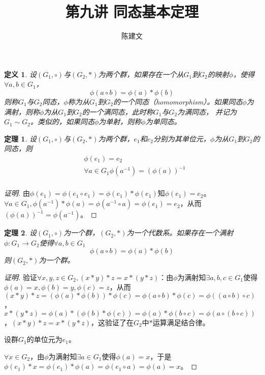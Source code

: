 \documentclass{article}
\newtheorem{Def}{定义}
\newtheorem{Thm}{定理}
\begin{document}
\begin{CJK*}{UTF8}{gbsn}
  \title{第九讲 同态基本定理}
  \author{陈建文}
  \maketitle
  

\begin{Def}
  设$(G_1,\circ)$与$(G_2,*)$为两个群，如果存在一个从$G_1$到$G_2$的映射$\phi$，使得$\forall a,b\in G_1$，\[\phi(a\circ b)=\phi(a)* \phi(b)\]
  则称$G_1$与$G_2$同态，$\phi$称为从$G_1$到$G_2$的一个同态（homomorphism）。如果同态$\phi$为满射，则称$\phi$为从$G_1$到$G_2$的一个满同态，此时称$G_1$与$G_2$为满同态，
  并记为$G_1\sim G_2$。类似的，如果同态$\phi$为单射，则称$\phi$为单同态。
\end{Def}

\begin{Thm}
  设$(G_1,\circ)$与$(G_2,*)$为两个群，$e_1$和$e_2$分别为其单位元，$\phi$为从$G_1$到$G_2$的同态，则
  \begin{align*}
    &\phi(e_1)=e_2\\
    &\forall a\in G_1 \phi(a^{-1})=(\phi(a))^{-1}\\
  \end{align*}
\end{Thm}
\begin{proof}[证明]
  由$\phi(e_1)=\phi(e_1\circ e_1)=\phi(e_1)*\phi(e_1)$知$\phi(e_1)=e_2$。
  $\forall a\in G_1, \phi(a^{-1})*\phi(a)=\phi(a^{-1}\circ a)=\phi(e_1)=e_2$，从而$(\phi(a))^{-1}=\phi(a^{-1})$。
\end{proof}
\begin{Thm}
  设$(G_1,\circ)$为一个群，$(G_2,*)$为一个代数系。如果存在一个满射$\phi:G_1\to G_2$使得$\forall a,b\in G_1$
  \[\phi(a\circ b)=\phi(a) * \phi(b)\]
  则$(G_2,*)$为一个群。
\end{Thm}
\begin{proof}[证明]
  验证$\forall x,y,z\in G_2,(x*y)*z=x*(y*z)$：由$\phi$为满射知$\exists a,b,c\in G_1$使得$\phi(a)=x,\phi(b)=y,\phi(c)=z$，从而
  $(x*y)*z=(\phi(a)*\phi(b))*\phi(c)=\phi(a\circ b)*\phi(c)=\phi((a\circ b)\circ c)$，$x*(y*z)=\phi(a)* (\phi(b)*\phi(c))=\phi(a)*\phi(b\circ c)=\phi(a\circ (b\circ c))$，$(x*y)*z=x*(y*z)$，这验证了在$G_2$中$*$运算满足结合律。

  设群$G_1$的单位元为$e_1$。


  $\forall x\in G_2$，由$\phi$为满射知$\exists a\in G_1$使得$\phi(a)=x$，于是$\phi(e_1)*x=\phi(e_1)*\phi(a)=\phi(e_1\circ a)=\phi(a)=x$。


\end{proof}
\end{CJK*}
\end{document}
